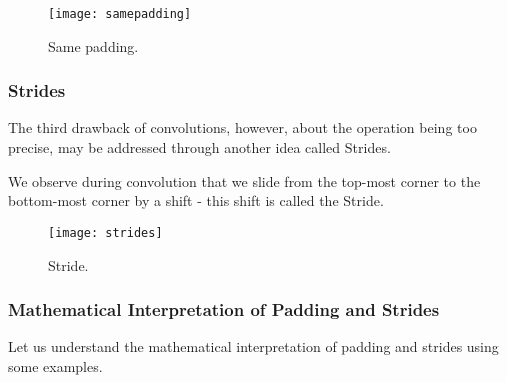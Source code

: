 	\begin{figure}[h]
		\centering
		\texttt{[image: samepadding]}
		\caption[Same padding]{Same padding.}
		\label{fig:samepadding}
	\end{figure}


	\subsubsection{Strides}

	\begin{bulletedlist}
		\item The third drawback of convolutions, however, about the operation being too precise, may be addressed through another idea called Strides.
		\item We observe during convolution that we slide from the top-most corner to the bottom-most corner by a shift - this shift is called the Stride.
	\end{bulletedlist}

	\begin{figure}[h]
		\centering
		\texttt{[image: strides]}
		\caption[Stride]{Stride.}
		\label{fig:strides}
	\end{figure}


	\subsubsection{Mathematical Interpretation of Padding and Strides}

Let us understand the mathematical interpretation of padding and strides using some examples.


